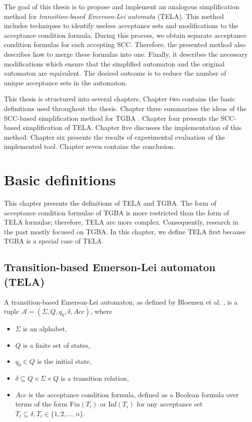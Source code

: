 \documentclass[
  digital, %
  twoside, %
  table,   %
  lof,     %
  lot,     %
]{fithesis3}
\begin{document}
The goal of this thesis is to propose and implement an analogous simplification method for \emph{transition-based Emerson-Lei automata} (TELA). This method includes techniques to identify useless acceptance sets and modifications to the acceptance condition formula. During this process, we obtain separate acceptance condition formulas for each accepting SCC. Therefore, the presented method also describes how to merge these formulas into one. Finally, it describes the necessary modifications which ensure that the simplified automaton and the original automaton are equivalent. The desired outcome is to reduce the number of unique acceptance sets in the automaton. 

This thesis is structured into several chapters. Chapter two contains the basic definitions used throughout the thesis. Chapter three summarizes the ideas of the SCC-based simplification method for TGBA \cite{spin2013}. Chapter four presents the SCC-based simplification of TELA. Chapter five discusses the implementation of this method. Chapter six presents the results of experimental evaluation of the implemented tool. Chapter seven contains the conclusion. 

\chapter{Basic definitions}
\label{chap:basic_definitions}
This chapter presents the definitions of TELA and TGBA. The form of acceptance condition formulae of TGBA is more restricted than the form of TELA formulae; therefore, TELA are more complex. Consequently, research in the past mostly focused on TGBA.  In this chapter, we define TELA first because TGBA is a special case of TELA.

\section{Transition-based Emerson-Lei automaton (TELA)} 
\label{sec:tela}
A transition-based Emerson-Lei automaton, as defined by Bloemen et al. \cite{bloemen2017}, is a tuple $\mathcal{A} = (\Sigma, Q, q_0, \delta, Acc)$, where
\begin{itemize}
  \item $\Sigma$ is an alphabet,
  \item $Q$ is a finite set of states,
  \item $q_0 \in Q$ is the initial state,
  \item $\delta \subseteq Q \times \Sigma \times Q$ is a transition relation,
  \item $Acc$ is the acceptance condition formula, defined as a Boolean formula over terms of the form Fin$(T_i)$ or Inf$(T_i)$ for any acceptance set $T_i \subseteq \delta, T_i \in \{1, 2, \dots, n\}$. 
\end{itemize}
\end{document}
